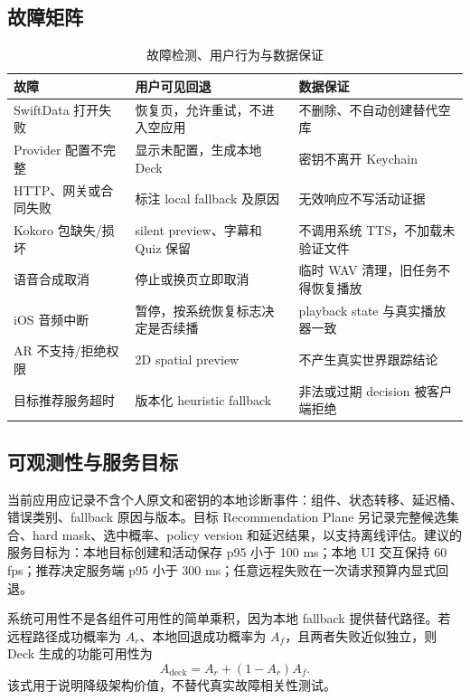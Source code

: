\documentclass[11pt,a4paper,fontset=none]{ctexart}
\begin{document}
\subsection{故障矩阵}
\begin{table}[htbp]
\centering
\small
\caption{故障检测、用户行为与数据保证}
\begin{tabularx}{\textwidth}{P{31mm}P{39mm}Y}
\toprule
故障 & 用户可见回退 & 数据保证 \\
\midrule
SwiftData 打开失败 & 恢复页，允许重试，不进入空应用 & 不删除、不自动创建替代空库 \\
Provider 配置不完整 & 显示未配置，生成本地 Deck & 密钥不离开 Keychain \\
HTTP、网关或合同失败 & 标注 local fallback 及原因 & 无效响应不写活动证据 \\
Kokoro 包缺失/损坏 & silent preview、字幕和 Quiz 保留 & 不调用系统 TTS，不加载未验证文件 \\
语音合成取消 & 停止或换页立即取消 & 临时 WAV 清理，旧任务不得恢复播放 \\
iOS 音频中断 & 暂停，按系统恢复标志决定是否续播 & playback state 与真实播放器一致 \\
AR 不支持/拒绝权限 & 2D spatial preview & 不产生真实世界跟踪结论 \\
目标推荐服务超时 & 版本化 heuristic fallback & 非法或过期 decision 被客户端拒绝 \\
\bottomrule
\end{tabularx}
\end{table}

\subsection{可观测性与服务目标}
当前应用应记录不含个人原文和密钥的本地诊断事件：组件、状态转移、延迟桶、错误类别、fallback 原因与版本。目标 Recommendation Plane 另记录完整候选集合、hard mask、选中概率、policy version 和延迟结果，以支持离线评估。建议的服务目标为：本地目标创建和活动保存 p95 小于 100 ms；本地 UI 交互保持 60 fps；推荐决定服务端 p95 小于 300 ms；任意远程失败在一次请求预算内显式回退。

系统可用性不是各组件可用性的简单乘积，因为本地 fallback 提供替代路径。若远程路径成功概率为 $A_r$、本地回退成功概率为 $A_f$，且两者失败近似独立，则 Deck 生成的功能可用性为
\begin{equation}
  A_{\mathrm{deck}} = A_r + (1-A_r)A_f.
\end{equation}
该式用于说明降级架构价值，不替代真实故障相关性测试。
\end{document}
